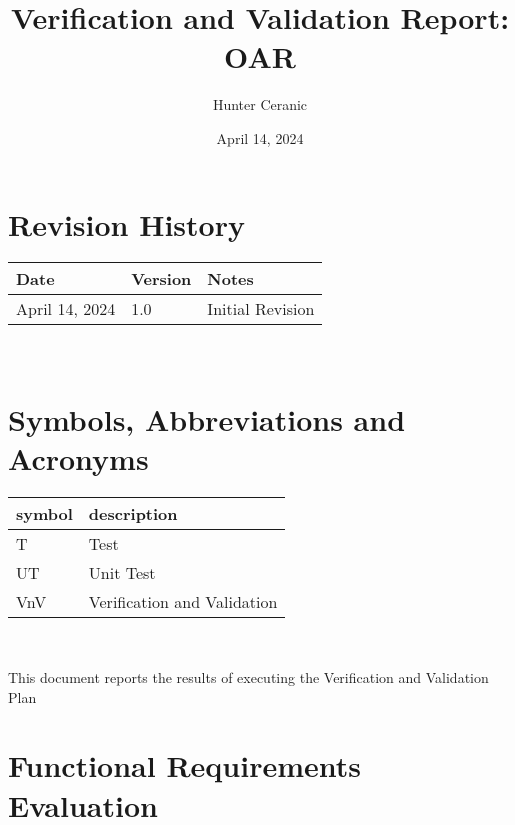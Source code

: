 \documentclass[12pt, titlepage]{article}
\begin{document}
\title{Verification and Validation Report: OAR} 
\author{Hunter Ceranic}
\date{April 14, 2024}
	
\maketitle


\section{Revision History}

\begin{tabularx}{\textwidth}{p{3cm}p{2cm}X}
\toprule {\bf Date} & {\bf Version} & {\bf Notes}\\
\midrule
April 14, 2024 & 1.0 & Initial Revision\\
\bottomrule
\end{tabularx}

~\newpage

\section{Symbols, Abbreviations and Acronyms}

\renewcommand{\arraystretch}{1.2}
\begin{tabular}{l l} 
  \toprule		
  \textbf{symbol} & \textbf{description}\\
  \midrule 
  T & Test\\
  UT & Unit Test\\
  VnV& Verification and Validation\\
  \bottomrule
\end{tabular}\\

\newpage

\tableofcontents

\newpage


This document reports the results of executing the Verification and Validation Plan \citep{VnV_plan}

\section{Functional Requirements Evaluation}
\end{document}
